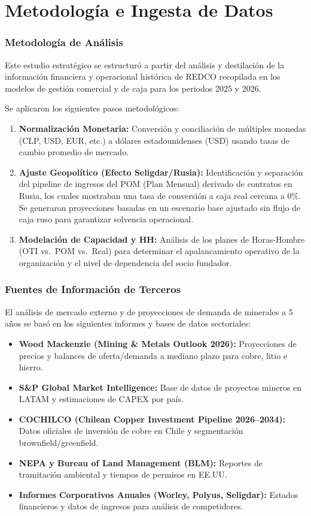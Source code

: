 \appendix

\chapter{Metodología e Ingesta de Datos}

\subsection{Metodología de Análisis}

Este estudio estratégico se estructuró a partir del análisis y destilación de la información financiera y operacional histórica de REDCO recopilada en los modelos de gestión comercial y de caja para los periodos 2025 y 2026. 

Se aplicaron los siguientes pasos metodológicos:
\begin{enumerate}
    \item \textbf{Normalización Monetaria:} Conversión y conciliación de múltiples monedas (CLP, USD, EUR, etc.) a dólares estadounidenses (USD) usando tasas de cambio promedio de mercado.
    \item \textbf{Ajuste Geopolítico (Efecto Seligdar/Rusia):} Identificación y separación del pipeline de ingresos del POM (Plan Mensual) derivado de contratos en Rusia, los cuales mostraban una tasa de conversión a caja real cercana a 0\%. Se generaron proyecciones basadas en un escenario base ajustado sin flujo de caja ruso para garantizar solvencia operacional.
    \item \textbf{Modelación de Capacidad y HH:} Análisis de los planes de Horas-Hombre (OTI vs.\ POM vs.\ Real) para determinar el apalancamiento operativo de la organización y el nivel de dependencia del socio fundador.
\end{enumerate}

\subsection{Fuentes de Información de Terceros}

El análisis de mercado externo y de proyecciones de demanda de minerales a 5 años se basó en los siguientes informes y bases de datos sectoriales:
\begin{itemize}
    \item \textbf{Wood Mackenzie (Mining \& Metals Outlook 2026):} Proyecciones de precios y balances de oferta/demanda a mediano plazo para cobre, litio e hierro.
    \item \textbf{S\&P Global Market Intelligence:} Base de datos de proyectos mineros en LATAM y estimaciones de CAPEX por país.
    \item \textbf{COCHILCO (Chilean Copper Investment Pipeline 2026--2034):} Datos oficiales de inversión de cobre en Chile y segmentación brownfield/greenfield.
    \item \textbf{NEPA y Bureau of Land Management (BLM):} Reportes de tramitación ambiental y tiempos de permisos en EE.UU.
    \item \textbf{Informes Corporativos Anuales (Worley, Polyus, Seligdar):} Estados financieros y datos de ingresos para análisis de competidores.
\end{itemize}
